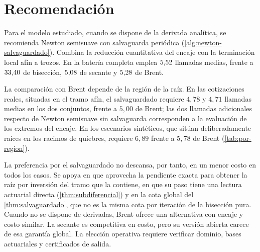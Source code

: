\section{Recomendación}
\begin{aporte}
Para el modelo estudiado, cuando se dispone de la derivada analítica, se recomienda
Newton semisuave con salvaguarda periódica (\cref{alg:newton-salvaguardado}).
Combina la reducción cuantitativa del encaje con la terminación local afín a
trozos. En la batería completa emplea $5{,}52$ llamadas medias, frente a
$33{,}40$ de bisección, $5{,}08$ de secante y $5{,}28$ de Brent.

La comparación con Brent depende de la región de la raíz. En las cotizaciones
reales, situadas en el tramo afín, el salvaguardado requiere $4{,}78$ y
$4{,}71$ llamadas medias en los dos conjuntos, frente a $5{,}00$ de Brent; las
dos llamadas adicionales respecto de Newton semisuave sin salvaguarda
corresponden a la evaluación de los extremos del encaje. En los escenarios
sintéticos, que sitúan deliberadamente raíces en los racimos de quiebres,
requiere $6{,}89$ frente a $5{,}78$ de Brent (\cref{tab:por-region}).

La preferencia por el salvaguardado no descansa, por tanto, en un menor costo
en todos los casos. Se apoya en que aprovecha la pendiente exacta para obtener
la raíz por inversión del tramo que la contiene, en que su paso tiene una
lectura actuarial directa (\cref{thm:subdiferencial}) y en la cota global del
\cref{thm:salvaguardado}, que no es la misma cota por iteración de la bisección
pura. Cuando no se dispone de derivadas, Brent ofrece una alternativa con encaje
y costo similar. La secante es competitiva en costo, pero su versión abierta
carece de esa garantía global. La elección operativa requiere verificar dominio,
bases actuariales y certificados de salida.
\end{aporte}
